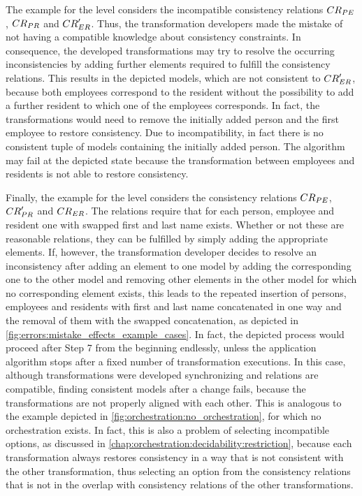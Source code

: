 The example for the \levelnetworkrelation level considers the incompatible consistency relations $\consistencyrelation{CR}{PE}$, $\consistencyrelation{CR}{PR}$ and $\consistencyrelation{CR}{ER}'$. Thus, the transformation developers made the mistake of not having a compatible knowledge about consistency constraints.
In consequence, the developed transformations may try to resolve the occurring inconsistencies by adding further elements required to fulfill the consistency relations.
This results in the depicted models, which are not consistent to $\consistencyrelation{CR}{ER}'$, because both employees correspond to the resident without the possibility to add a further resident to which one of the employees corresponds.
In fact, the transformations would need to remove the initially added person and the first employee to restore consistency.
Due to incompatibility, in fact there is no consistent tuple of models containing the initially added person.
The algorithm may fail at the depicted state because the transformation between employees and residents is not able to restore consistency.

Finally, the example for the \levelnetworkrule level considers the consistency relations $\consistencyrelation{CR}{PE}$, $\consistencyrelation{CR}{PR}'$ and $\consistencyrelation{CR}{ER}$.
The relations require that for each person, employee and resident one with swapped first and last name exists.
Whether or not these are reasonable relations, they can be fulfilled by simply adding the appropriate elements.
If, however, the transformation developer decides to resolve an inconsistency after adding an element to one model by adding the corresponding one to the other model and removing other elements in the other model for which no corresponding element exists, this leads to the repeated insertion of persons, employees and residents with first and last name concatenated in one way and the removal of them with the swapped concatenation, as depicted in \autoref{fig:errors:mistake_effects_example_cases}.
In fact, the depicted process would proceed after Step 7 from the beginning endlessly, unless the application algorithm stops after a fixed number of transformation executions.
In this case, although transformations were developed synchronizing and relations are compatible, finding consistent models after a change fails, because the transformations are not properly aligned with each other.
This is analogous to the example depicted in \autoref{fig:orchestration:no_orchestration}, for which no orchestration exists.
In fact, this is also a problem of selecting incompatible options, as discussed in \autoref{chap:orchestration:decidability:restriction}, because each transformation always restores consistency in a way that is not consistent with the other transformation, thus selecting an option from the consistency relations that is not in the overlap with consistency relations of the other transformations.

